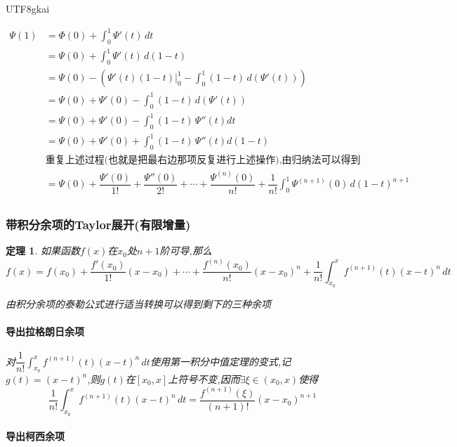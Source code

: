 \documentclass{article}
\newtheorem{theorem}{定理}[subsection]
\newenvironment{cproof}{%
\heiti{证明}\kaishu
}{%
}
\begin{document}
\begin{CJK}{UTF8}{gkai}
\begin{cproof}
  \[
  \begin{aligned}
\varPsi(1)&= \varPhi(0) + \int_{0}^{1}\varPsi'(t)\,dt\\
&=\varPsi(0) + \int_{0}^{1}\varPsi'(t)\,d(1-t)\\
&=\varPsi(0) -( \varPsi'(t)(1-t)|_0^1 - \int_{0}^{1}(1-t)\,d(\varPsi'(t)))\\
&=\varPsi(0) + \varPsi'(0) - \int_{0}^{1}(1-t)\,d(\varPsi'(t))\\
&=\varPsi(0) + \varPsi'(0) - \int_{0}^{1}(1-t)\,\varPsi''(t)dt\\
&=\varPsi(0) + \varPsi'(0) + \int_{0}^{1}(1-t)\,\varPsi''(t)d(1-t)\\
&\text{重复上述过程(也就是把最右边那项反复进行上述操作),由归纳法可以得到}\\
&= \varPsi(0) + \dfrac{\varPsi'(0)}{1!} +\dfrac{\varPsi''(0)}{2!}+\cdots +\dfrac{\varPsi^{(n)}(0)}{n!} + \dfrac{1}{n!}\int_{0}^{1}\varPsi^{(n + 1)}(0)\, d{(1 - t)^{n + 1}}\\
\end{aligned}
\]
\end{cproof}

\subsubsection{带积分余项的Taylor展开(有限增量)}
\begin{theorem}
如果函数$f(x)$在$x_0$处$n + 1$阶可导,那么
\[f(x) = f(x_0) + \dfrac{f'(x_0)}{1!}(x - x_0) +\cdots + \dfrac{f^{(n)}(x_0)}{n!}(x - x_0)^n + \dfrac{1}{n!}\int_{x_0}^{x} f^{(n + 1)}(t) (x - t)^n\,dt\]

由积分余项的泰勒公式进行适当转换可以得到剩下的三种余项
\paragraph{导出拉格朗日余项\\}

对$ \dfrac{1}{n!}\int_{x_0}^{x} f^{(n + 1)}(t) (x - t)^n\,dt$使用第一积分中值定理的变式,记$g(t ) = (x - t)^n$,则$g(t)$在$[x_0,x]$上符号不变,因而$\exists \xi \in (x_0,x)$使得
\[ \dfrac{1}{n!}\int_{x_0}^{x} f^{(n + 1)}(t) (x - t)^n\,dt = \dfrac{f^{(n + 1)}(\xi)}{(n + 1)!}(x - x_0)^{n + 1}\]

\paragraph{导出柯西余项\\}


\end{theorem}
\end{CJK}
\end{document}
